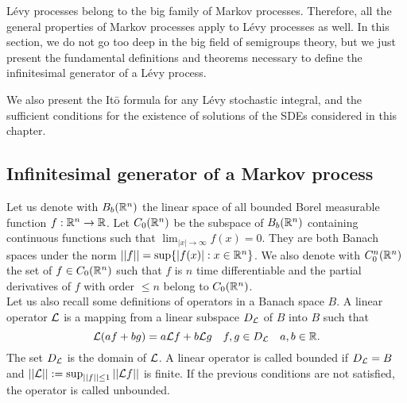 Lévy processes belong to the big family of Markov processes. Therefore, all the general properties of Markov processes apply to
Lévy processes as well.
In this section,
we do not go too deep in the big field of semigroups theory, but we just present the fundamental definitions and 
theorems necessary to define the infinitesimal generator of a Lévy process.

We also present the It\={o} formula for any Lévy stochastic integral, and the sufficient conditions for the existence of solutions of the SDEs 
considered in this chapter. 


\subsection{Infinitesimal generator of a Markov process}


Let us denote with $B_b(\mathbb{R}^n)$ 
the linear space of all bounded Borel measurable function $f: \mathbb{R}^n \to \mathbb{R}$. 
Let $C_0(\mathbb{R}^n)$ be the subspace of $B_b(\mathbb{R}^n)$ containing continuous functions such that $\lim_{|x|\to \infty} f(x) = 0$.
They are both Banach spaces under the norm $||f|| = \sup\{ |f(x)| : x\in \mathbb{R}^n \}$.
We also denote with $C_0^{n}(\mathbb{R}^n)$ the set of $f \in C_0(\mathbb{R}^n)$ such that $f$ is $n$ time differentiable and 
the partial derivatives of $f$ with order $\leq n$ belong to $C_0(\mathbb{R}^n)$.  \\
Let us also recall some definitions of operators in a Banach space $B$.
A linear operator $\mathcal{L}$ is a mapping from a linear subspace $D_{\mathcal{L}}$ of $B$ into $B$ such that 
$$ \mathcal{L} ( af + bg ) = a \mathcal{L} f + b \mathcal{L} g  \quad f,g \in D_{\mathcal{L}} \quad a,b \in \mathbb{R}. $$
The set $D_{\mathcal{L}}$ is the domain of $\mathcal{L}$. A linear operator is called bounded if $D_{\mathcal{L}} = B$ and $||\mathcal{L}|| := \sup_{||f||\leq 1} ||\mathcal{L} f||$ is finite.
If the previous conditions are not satisfied, the operator is called unbounded.

